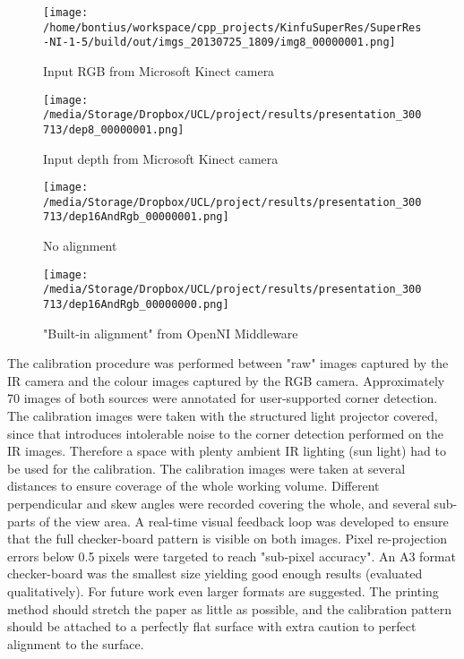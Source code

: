 \documentclass{ucl_thesis}
\begin{document}
\begin{figure}[h!]\centering
    \begin{minipage}[b]{0.49\linewidth}
        \texttt{[image: /home/bontius/workspace/cpp\_projects/KinfuSuperRes/SuperRes-NI-1-5/build/out/imgs\_20130725\_1809/img8\_00000001.png]}
        \caption{Input RGB from Microsoft Kinect camera}
    \end{minipage}
    \begin{minipage}[b]{0.49\linewidth}
        \texttt{[image: /media/Storage/Dropbox/UCL/project/results/presentation\_300713/dep8\_00000001.png]}
		\caption{Input depth from Microsoft Kinect camera}
    \end{minipage}
    \label{fig:input}
\end{figure}

\begin{figure}[h!]\centering
	\begin{minipage}[b]{0.49\linewidth}
		\texttt{[image: /media/Storage/Dropbox/UCL/project/results/presentation\_300713/dep16AndRgb\_00000001.png]}
		\caption{No alignment}
	\end{minipage}
	\begin{minipage}[b]{0.49\linewidth}
		\texttt{[image: /media/Storage/Dropbox/UCL/project/results/presentation\_300713/dep16AndRgb\_00000000.png]}
		\caption{"Built-in alignment" from OpenNI Middleware}
	\end{minipage}
	\label{fig:calib_built_int}
\end{figure}

\par The calibration procedure was performed between "raw" images captured by the IR camera and the colour images captured by the RGB camera. Approximately 70 images of both sources were annotated for user-supported corner detection. The calibration images were taken with the structured light projector covered, since that introduces intolerable noise to the corner detection performed on the IR images. Therefore a space with plenty ambient IR lighting (sun light) had to be used for the calibration. The calibration images were taken at several distances to ensure coverage of the whole working volume. Different perpendicular and skew angles were recorded covering the whole, and several sub-parts of the view area. A real-time visual feedback loop was developed to ensure that the full checker-board pattern is visible on both images. Pixel re-projection errors below 0.5 pixels were targeted to reach "sub-pixel accuracy". An A3 format checker-board was the smallest size yielding good enough results (evaluated qualitatively). For future work even larger formats are suggested. The printing method should stretch the paper as little as possible, and the calibration pattern should be attached to a perfectly flat surface with extra caution to  perfect alignment to the surface.
\end{document}
